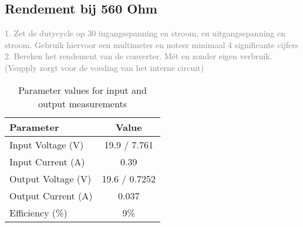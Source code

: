 \subsection{Rendement bij 560 Ohm}
\textcolor{gray}{1. Zet de dutycycle op 30%
ingangsspanning en stroom, en uitgangsspanning en stroom. Gebruik hiervoor een
multimeter en noteer minimaal 4 significante cijfers}\newline
\textcolor{gray}{
2. Bereken het rendement van de converter. Mét en zonder eigen verbruik. (Vsupply zorgt
voor de voeding van het interne circuit)} \newline
\begin{table}[h!]
\centering
\begin{tabular}{|l|c|}
\hline
\textbf{Parameter} & \textbf{Value} \\ \hline
Input Voltage (V) & 19.9 / 7.761 \\ \hline
Input Current (A) & 0.39 \\ \hline
Output Voltage (V) & 19.6 / 0.7252 \\ \hline
Output Current (A) & 0.037 \\ \hline
Efficiency (\%) & 9\% \\ \hline
\end{tabular}
\caption{Parameter values for input and output measurements}
\label{tab:parameter_values}
\end{table}
